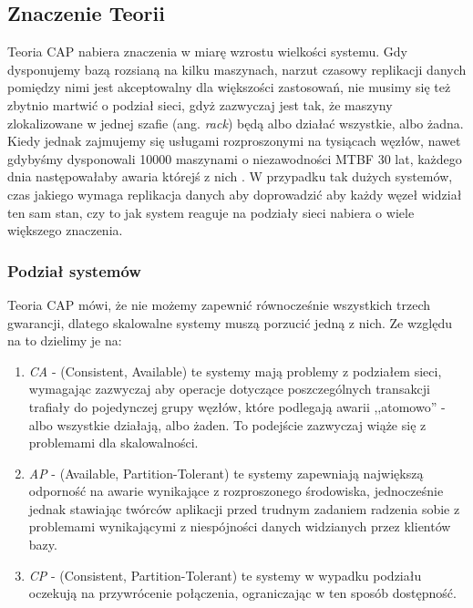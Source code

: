 \subsection*{Znaczenie Teorii}

Teoria CAP nabiera znaczenia w miarę wzrostu wielkości systemu. 
Gdy dysponujemy bazą rozsianą na kilku maszynach, narzut czasowy replikacji danych pomiędzy nimi jest akceptowalny dla większości zastosowań, nie musimy się też zbytnio martwić o podział sieci, gdyż zazwyczaj jest tak, że maszyny zlokalizowane w jednej szafie (ang. \emph{rack}) będą albo działać wszystkie, albo żadna. 
Kiedy jednak zajmujemy się usługami rozproszonymi na tysiącach węzłów, nawet gdybyśmy dysponowali 10000 maszynami o niezawodności MTBF 30 lat, każdego dnia następowałaby awaria którejś z nich \cite{google-lessons}. 
W przypadku tak dużych systemów, czas jakiego wymaga replikacja danych aby doprowadzić aby każdy węzeł widział ten sam stan, czy to jak system reaguje na podziały sieci nabiera o wiele większego znaczenia.

\subsubsection*{Podział systemów}

Teoria CAP mówi, że nie możemy zapewnić równocześnie wszystkich trzech gwarancji, dlatego skalowalne systemy muszą porzucić jedną z nich. 
Ze względu na to dzielimy je na:

\begin{enumerate}
 \item \emph{CA} - (Consistent, Available) te systemy mają problemy z podziałem sieci, wymagając zazwyczaj aby operacje dotyczące poszczególnych transakcji trafiały do pojedynczej grupy węzłów, które podlegają awarii ,,atomowo'' - albo wszystkie działają, albo żaden. 
 To podejście zazwyczaj wiąże się z problemami dla skalowalności.
 \item \emph{AP} - (Available, Partition-Tolerant) te systemy zapewniają największą odporność na awarie wynikające z rozproszonego środowiska, jednocześnie jednak stawiając twórców aplikacji przed trudnym zadaniem radzenia sobie z problemami wynikającymi z niespójności danych widzianych przez klientów bazy.
 \item \emph{CP} - (Consistent, Partition-Tolerant) te systemy w wypadku podziału oczekują na przywrócenie połączenia, ograniczając w ten sposób dostępność.
\end{enumerate}

